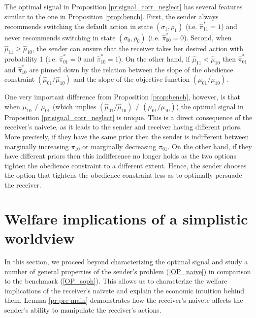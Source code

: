 \documentclass[12pt,english]{article}
\theoremstyle{plain}
\begin{document}
The optimal signal in Proposition \ref{pr:signal_corr_neglect} has
several features similar to the one in  Proposition \ref{prop:bench}. 
First, the sender always recommends switching the default action in state $(\sigma_{1},\rho_{1})$ (i.e. $\hat\pi^*_{11}=1$) and never recommends switching in state $(\sigma_{0},\rho_{0})$ (i.e. $\hat{\pi}_{00}^{*}=0$).
Second, when $\hat\mu_{11}\geq\hat\mu_{10}$, the sender can ensure that the receiver takes her desired action with probability 1 (i.e. $\hat{\pi}_{01}^{*}=0$ and $\hat{\pi}_{10}^{*}=1$). 
On the other hand, if $\hat\mu_{11}<\hat\mu_{10}$ then $\hat\pi^*_{01}$ and $\hat\pi^*_{10}$ are pinned down by the relation between the slope of the obedience constraint $(\hat\mu_{01}/\hat\mu_{10})$ and the slope of the objective function $(\mu_{01}/\mu_{10})$.

One very important difference from Proposition \ref{prop:bench}, however, is that when $\mu_{10}\neq\mu_{01}$ (which implies $(\hat\mu_{01}/\hat\mu_{10})\neq(\mu_{01}/\mu_{10})$) the optimal signal in Proposition \ref{pr:signal_corr_neglect} is unique. 
This is a direct consequence of the receiver's naivete, as it leads to the sender and receiver having different priors. 
More precisely, if they have the same prior then the sender is indifferent between marginally increasing $\pi_{10}$ or marginally decreasing $\pi_{01}$.
On the other hand, if they have different priors then this indifference no longer holds as the two options tighten the obedience constraint to a different extent.
Hence, the sender chooses the option that tightens the obedience constraint less as to optimally persuade the receiver. 


\section{Welfare implications of a simplistic worldview}
In this section, we proceed beyond characterizing the optimal signal and study a number of general properties of the sender's problem (\ref{OP_naive}) in comparison to the benchmark (\ref{OP_soph}). 
This allows us to characterize the welfare implications of the receiver's naivete and explain the economic intuition behind them. 
Lemma \ref{pr:pre-main} demonstrates how the receiver's naivete
affects the sender's ability to manipulate the receiver's actions.
\end{document}
